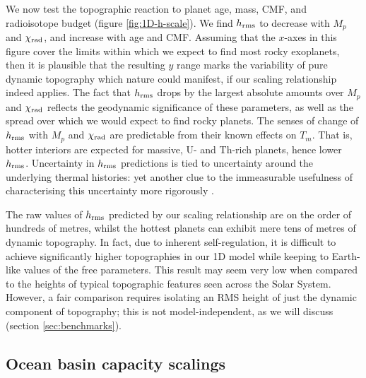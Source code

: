 \documentclass[trackchanges]{aastex63}
\newcommand{\todo}[1]{\textit{\textcolor{violet}{{#1}}}}
\begin{document}
We now test the topographic reaction to planet age, mass, CMF, and radioisotope budget (figure \ref{fig:1D-h-scale}). We find $h_{\rm rms}$ to decrease with $M_p$ and $\chi_{\rm rad}$, and increase with age and CMF. Assuming that the $x$-axes in this figure cover the limits within which we expect to find most rocky exoplanets, then it is plausible that the resulting $y$ range marks the variability of pure dynamic topography which nature could manifest, if our scaling relationship indeed applies. The fact that $h_{\rm rms}$ drops by the largest absolute amounts over $M_p$ and $\chi_{\rm rad}$ reflects the geodynamic significance of these parameters, as well as the spread over which we would expect to find rocky planets. The senses of change of $h_{\rm rms}$ with $M_p$ and $\chi_{\rm rad}$ are predictable from their known effects on $T_m$. That is, hotter interiors are expected for massive, U- and Th-rich planets, hence lower $h_{\rm rms}$. Uncertainty in $h_{\rm rms}$ predictions is tied to uncertainty around the underlying thermal histories: yet another clue to the immeasurable usefulness of characterising this uncertainty more rigorously \citep[e.g.,][]{seales_uncertainty_2020}.

The raw values of $h_{\rm rms}$ predicted by our scaling relationship are on the order of hundreds of metres, whilst the hottest planets can exhibit mere tens of metres of dynamic topography. In fact, due to inherent self-regulation, it is difficult to achieve significantly higher topographies in our 1D model while keeping to Earth-like values of the free parameters. This result may seem very low when compared to the heights of typical topographic features seen across the Solar System. However, a fair comparison requires isolating an RMS height of just the dynamic component of topography; this is not model-independent, as we will discuss (section \ref{sec:benchmarks}). 




\subsection{Ocean basin capacity scalings}
\label{sec:results-ocean}
\end{document}
